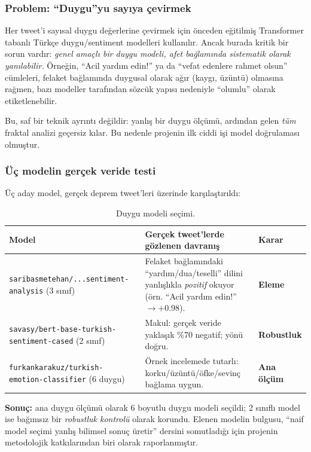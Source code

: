 \documentclass[11pt,a4paper]{article}
\begin{document}
\subsubsection{Problem: ``Duygu''yu sayıya çevirmek}
Her tweet'i sayısal duygu değerlerine çevirmek için önceden eğitilmiş
Transformer tabanlı Türkçe duygu/sentiment modelleri kullanılır. Ancak burada
kritik bir sorun vardır: \emph{genel amaçlı bir duygu modeli, afet bağlamında
sistematik olarak yanılabilir.} Örneğin, ``Acil yardım edin!'' ya da
``vefat edenlere rahmet olsun'' cümleleri, felaket bağlamında duygusal
olarak ağır (kaygı, üzüntü) olmasına rağmen, bazı modeller tarafından
sözcük yapısı nedeniyle ``olumlu'' olarak etiketlenebilir.

Bu, saf bir teknik ayrıntı değildir: yanlış bir duygu ölçümü, ardından gelen
\emph{tüm} fraktal analizi geçersiz kılar. Bu nedenle projenin ilk ciddi işi
model doğrulaması olmuştur.

\subsubsection{Üç modelin gerçek veride testi}
Üç aday model, gerçek deprem tweet'leri üzerinde karşılaştırıldı:

\begin{table}[H]
\centering
\caption{Duygu modeli seçimi.}
\label{tab:models}
\begin{tabular}{p{5.2cm}p{6.6cm}p{2.6cm}}
\toprule
Model & Gerçek tweet'lerde gözlenen davranış & Karar\\
\midrule
\texttt{saribasmetehan/...sentiment-analysis} (3 sınıf) &
Felaket bağlamındaki ``yardım/dua/teselli'' dilini yanlışlıkla \emph{pozitif}
okuyor (örn. ``Acil yardım edin!'' $\to +0.98$). &
\textbf{Eleme}\\
\texttt{savasy/bert-base-turkish-sentiment-cased} (2 sınıf) &
Makul: gerçek veride yaklaşık \%70 negatif; yönü doğru. &
\textbf{Robustluk}\\
\texttt{furkankarakuz/turkish-emotion-classifier} (6 duygu) &
Örnek incelemede tutarlı: korku/üzüntü/öfke/sevinç bağlama uygun. &
\textbf{Ana ölçüm}\\
\bottomrule
\end{tabular}
\end{table}

\textbf{Sonuç:} ana duygu ölçümü olarak 6 boyutlu duygu modeli seçildi;
2 sınıflı model ise bağımsız bir \emph{robustluk kontrolü} olarak korundu.
Elenen modelin bulgusu, ``naif model seçimi yanlış bilimsel sonuç üretir''
dersini somutladığı için projenin metodolojik katkılarından biri olarak
raporlanmıştır.
\end{document}
